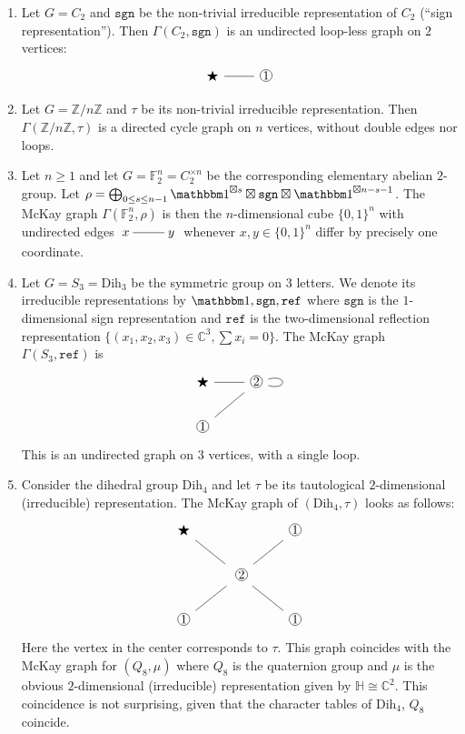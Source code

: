\documentclass[ALCO]{cedram}
\newcommand{\triv}{{\mathbbm 1}}
\newcommand{\C}{{\mathbb C}}
\newcommand{\Z}{{\mathbb Z}}
\newcommand{\sgn}{\mathtt{sgn}}
\newcommand*\circled[1]{\tikz[baseline=(char.base)]{
            \node[shape=circle,draw,inner sep=0.5pt] (char) {#1};}}
\begin{document}
\begin{exam}

\mbox{}

 \begin{enumerate}
 \item Let $G= C_2$ and $\sgn$ be the non-trivial irreducible representation 
of $C_2$ (``sign representation''). 
 Then $\Gamma(C_2, \sgn)$ is an undirected loop-less graph on $2$ vertices:
 $$
\begin{tikzcd}[arrows=-]
 \bigstar\arrow[r] & \circled{1}
\end{tikzcd}
$$

 \item Let $G= \Z/n\Z$ and $\tau$ be its non-trivial irreducible 
representation. 
Then $\Gamma(\Z/n\Z, \tau)$ is a directed cycle graph on $n$ vertices, without 
double edges nor loops. 
 \item {Let $n\geq 1$ and let $G = \mathbb{F}_2^n = C_2^{\times n}$ be the corresponding elementary abelian $2$-group}. Let $\rho = \bigoplus_{0 \leq s 
\leq n-1} \triv^{\boxtimes s} \boxtimes \sgn \boxtimes \triv^{\boxtimes n-s-1}
  $. The McKay graph $\Gamma(\mathbb{F}_2^n, \rho)$ is then the $n$-dimensional cube 
$\{0, 1\}^n$ with undirected edges $\xymatrix{x \ar@{-}[r]&y}$ whenever $x,y \in \{0, 1\}^n$ differ by 
precisely one coordinate.
 \item Let $G = S_3 = \mathrm{Dih}_3$ be the symmetric group on $3$ letters. We denote its 
irreducible representations by $\triv, \sgn, \mathtt{ref}$ where $\sgn$ is the 
$1$-dimensional sign representation and $\mathtt{ref}$ is the two-dimensional reflection 
representation $\{(x_1, x_2, x_3) \in \C^3, \sum x_i =0\}$. The McKay graph 
$\Gamma(S_3, \mathtt{ref})$ is 
$$ \begin{tikzcd}[arrows=-]
 \bigstar\arrow[r] & \circled{2} \arrow[ld] \arrow[loop right]{r}\\
 \circled{1}
\end{tikzcd}
$$
 This is an undirected graph on $3$ vertices, with a single loop.
 \item Consider the dihedral group $\mathrm{Dih}_{4}$ and let $\tau$ be its tautological $2$-dimensional (irreducible) 
representation. The McKay graph of $(\mathrm{Dih}_{4}, \tau)$ looks as follows:
$$
\begin{tikzcd}[arrows=-]
    \bigstar&& \circled{1} \\
&\ \circled{2} \arrow[ru]\arrow[lu]\arrow[ld]\arrow[rd]\\ 
 \circled{1} && \circled{1} 
\end{tikzcd}
$$
Here the vertex in the center corresponds to $\tau$.
 This graph coincides with the McKay graph for $(Q_8, \mu)$ where $Q_{8}$ is the 
quaternion group and $\mu$ is the obvious $2$-dimensional (irreducible) 
representation given by $\mathbb{H} \cong \C^2$. This coincidence is not 
surprising, given that the character tables of $\mathrm{Dih}_{4}$, $Q_8$ coincide.
 \end{enumerate}
\end{exam}
\end{document}
